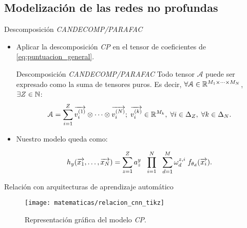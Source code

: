 \subsection{Modelización de las redes no profundas}
\begin{frame}{Descomposición \textit{CANDECOMP/PARAFAC}}
	\begin{itemize}
		\item Aplicar la descomposición \textit{CP} en el tensor de coeficientes de \eqref{eq:puntuacion_general}.

		      \begin{block}{Descomposición \textit{CANDECOMP/PARAFAC}}
			      Todo tensor $\mathcal{A}$ puede ser expresado como la suma de tensores puros. Es decir, $\forall \mathcal{A} \in \mathbb{R}^{M_1 \times \cdots \times M_N}$, $\exists Z \in \mathbb{N}$:
			      \begin{equation}
				      \mathcal{A} = \sum_{i = 1}^Z \overrightarrow{v_i^{(1)}} \otimes \cdots \otimes \overrightarrow{v_i^{(N)}};
				      \; \overrightarrow{v_i^{(k)}} \in \mathbb{R}^{M_k},
				      \; \forall i \in \Delta_{Z},
				      \; \forall k \in \Delta_{N}.
			      \end{equation}
		      \end{block}

		\item Nuestro modelo queda como:

		      \begin{equation} \label{eq:cp_model}
			      h_y(\overrightarrow{x_1}, \ldots, \overrightarrow{x_N}) =  \sum_{z = 1}^Z a_z^y \ \  \prod_{i = 1}^N \ \  \sum_{d = 1}^{M} \omega^{z, i}_d \; f_{\theta_{d}}(\overrightarrow{x_i}).
		      \end{equation}

	\end{itemize}
\end{frame}

\begin{frame}{Relación con arquitecturas de aprendizaje automático}
	\begin{figure}
		\centering
		\texttt{[image: matematicas/relacion\_cnn\_tikz]}
		\caption{Representación gráfica del modelo \textit{CP}.}
	\end{figure}

\end{frame}


